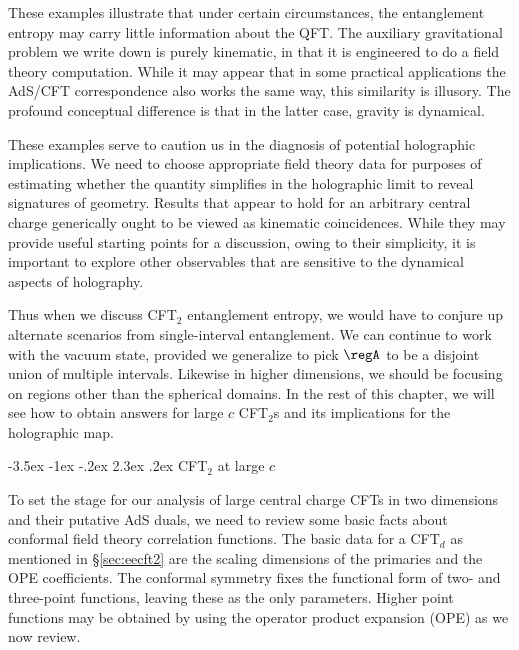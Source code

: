 \documentclass[12pt,openany]{book}
\makeatletter
\renewcommand\section{\@startsection {section}{1}{\z@}%
                                   {-3.5ex \@plus -1ex \@minus -.2ex}%
                                   {2.3ex \@plus.2ex}%
                                   {\normalfont\large\bfseries}}
\makeatother
\begin{document}
These examples illustrate that under certain circumstances, the entanglement entropy may carry little information about the QFT. The auxiliary gravitational problem we write down is purely kinematic, in that it is engineered to do a field theory computation. While it may appear that in some practical applications the AdS/CFT correspondence also  works the same way,  this similarity is illusory. The profound conceptual difference is that in the latter case, gravity is dynamical.

These examples serve to caution us  in the diagnosis of potential holographic implications. We need to choose appropriate field theory data for purposes of estimating whether the quantity simplifies in the holographic limit to reveal signatures of geometry.  Results that appear to hold for an arbitrary central charge generically ought to  be viewed as kinematic coincidences. While they may provide useful starting points for a discussion, owing to their simplicity, it is important to explore other observables that are sensitive to the dynamical aspects of holography.

Thus when we discuss CFT$_2$ entanglement entropy, we would have to conjure up alternate scenarios from single-interval entanglement. We can continue to work with the vacuum state, provided we generalize to pick $\regA$ to be a disjoint union of multiple intervals. Likewise in higher dimensions, we should be focusing on regions other than the spherical domains. In the rest of this chapter, we will see how to obtain answers for large $c$ CFT$_2$s and its implications for the holographic map.


\section{CFT$_2$ at large $c$}
\label{sec:}

To set the stage for our analysis of large central charge CFTs in two dimensions and their putative AdS duals, we need to review some basic facts about conformal field theory correlation functions. The basic data for a CFT$_d$ as mentioned in \S\ref{sec:eecft2} are the scaling dimensions of the primaries and the OPE coefficients. The conformal symmetry fixes the functional form of two- and three-point functions, leaving these as the only parameters. Higher point functions may be obtained by using the operator product expansion (OPE) as we now review.
\end{document}
